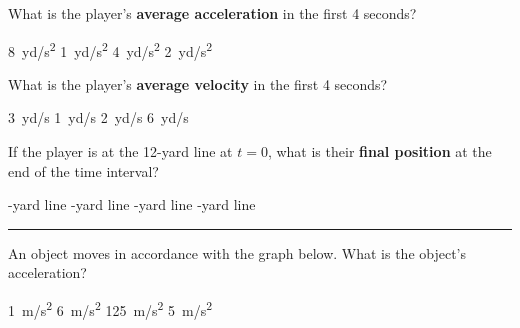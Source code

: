 \documentclass[../main-physics-problems.tex]{subfiles}
\begin{document}
\begin{questions}
\question \label{prob:FootballPlayer1}
What is the player's \textbf{average acceleration} in the first 4 seconds?

\begin{choices}
\choice \SI{8}{yd/s^2}
\correctchoice \SI{1}{yd/s^2}
\choice \SI{4}{yd/s^2}
\choice \SI{2}{yd/s^2}
\end{choices}

\question \label{prob:FootballPlayer2}
What is the player's \textbf{average velocity} in the first 4 seconds?

\begin{choices}
\choice \SI{3}{yd/s}
\choice \SI{1}{yd/s}
\choice \SI{2}{yd/s}
\correctchoice \SI{6}{yd/s}
\end{choices}

\question \label{prob:FootballPlayer3}
If the player is at the 12-yard line at $t=0$, what is their \textbf{final position} at the end of the time interval?

\begin{choices}
-yard line
-yard line
-yard line
-yard line
\end{choices}

\vspace{1em}
\hrule


\question
An object moves in accordance with the graph below. What is the object's acceleration?
\vspace{1em}

\begin{minipage}{0.3\textwidth}
    \begin{choices}
    \choice \SI{1}{m/s^2}
    \choice \SI{6}{m/s^2}
    \choice \SI{125}{m/s^2}
    \CorrectChoice \SI{5}{m/s^2}
    \end{choices}
\end{minipage}%
\begin{minipage}{0.3\textwidth}
\end{minipage}








\end{questions}
\end{document}
